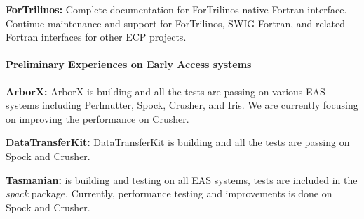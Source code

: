 {\bf ForTrilinos:} Complete documentation for ForTrilinos native Fortran
interface. Continue maintenance and support for ForTrilinos, SWIG-Fortran, and
related Fortran interfaces for other ECP projects.


\paragraph{Preliminary Experiences on Early Access systems}

\indent

{\bf ArborX:} ArborX is building and all the tests are passing on various EAS systems including Perlmutter, Spock, Crusher, and Iris. We are currently focusing on improving the performance on Crusher.

{\bf DataTransferKit:} DataTransferKit is building and all the tests are passing on Spock and Crusher.

{\bf Tasmanian:} is building and testing on all EAS systems, tests are included in the \emph{spack} package. Currently, performance testing and improvements is done on Spock and Crusher.



